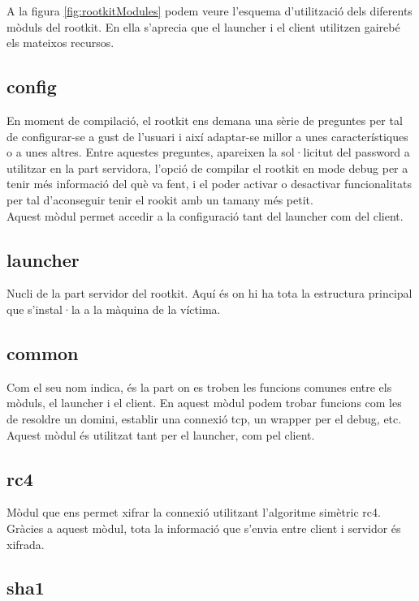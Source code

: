 A la figura \ref{fig:rootkitModules} podem veure l'esquema d'utilització dels diferents mòduls 
del rootkit. En ella s'aprecia que el launcher i el client utilitzen gairebé els mateixos recursos.\\
\subsection{config}

En moment de compilació, el rootkit ens demana una sèrie de preguntes per tal de configurar-se a gust
de l'usuari i així adaptar-se millor a unes característiques o a unes altres. Entre aquestes
preguntes, apareixen la sol·licitut del password a utilitzar en la part servidora, l'opció de compilar
el rootkit en mode debug per a tenir més informació del què va fent, i el poder activar o desactivar
funcionalitats per tal d'aconseguir tenir el rookit amb un tamany més petit. \\ 

Aquest mòdul permet accedir a la configuració tant del launcher com del client.

\subsection{launcher}

Nucli de la part servidor del rootkit. Aquí és on hi ha tota la estructura principal
que s'instal·la a la màquina de la víctima.

\subsection{common}

Com el seu nom indica, és la part on es troben les funcions comunes entre els mòduls, el launcher 
i el client. En aquest mòdul podem trobar funcions com les de resoldre un domini, establir una connexió
tcp, un wrapper per el debug, etc. \\

Aquest mòdul és utilitzat tant per el launcher, com pel client.
\subsection{rc4}

Mòdul que ens permet xifrar la connexió utilitzant l'algoritme simètric rc4. Gràcies a aquest mòdul,
tota la informació que s'envia entre client i servidor és xifrada. 

\subsection{sha1}

